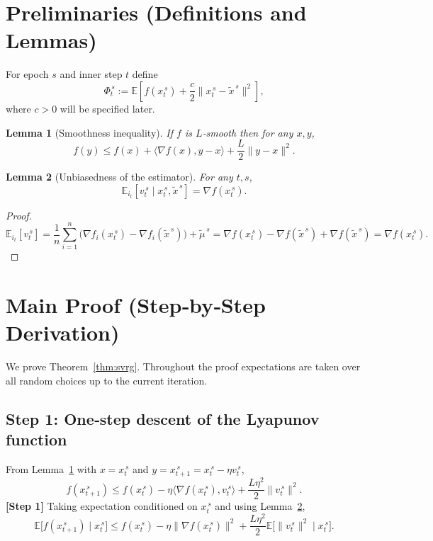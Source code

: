 \documentclass{article}
\newtheorem{lemma}{Lemma}
\newcommand{\EE}{\mathbb{E}}
\begin{document}
\section*{Preliminaries (Definitions and Lemmas)}
\begin{definition}\label{def:lyap}
For epoch $s$ and inner step $t$ define
\[
\Phi_{t}^{\,s}:= \EE\!\left[ f(x_{t}^{\,s}) + \frac{c}{2}\|x_{t}^{\,s}-\tilde{x}^{\,s}\|^{2}\right],
\tag{5}
\]
where $c>0$ will be specified later.
\end{definition}
\begin{lemma}[Smoothness inequality]\label{lem:smooth}
If $f$ is $L$‑smooth then for any $x,y$,
\[
f(y)\le f(x)+\langle\nabla f(x),y-x\rangle+\frac{L}{2}\|y-x\|^{2}.
\tag{6}
\]
\end{lemma}
\begin{lemma}[Unbiasedness of the estimator]\label{lem:unbiased}
For any $t,s$,
\[
\EE_{i_t}[v_t^{\,s}\mid x_{t}^{\,s},\tilde{x}^{\,s}]
= \nabla f(x_{t}^{\,s}).
\tag{7}
\]
\end{lemma}
\begin{proof}
\[
\EE_{i_t}[v_t^{\,s}]
=\frac{1}{n}\sum_{i=1}^{n}\bigl(\nabla f_i(x_{t}^{\,s})-\nabla f_i(\tilde{x}^{\,s})\bigr)+\tilde{\mu}^{\,s}
= \nabla f(x_{t}^{\,s})-\nabla f(\tilde{x}^{\,s})+\nabla f(\tilde{x}^{\,s})
= \nabla f(x_{t}^{\,s}).
\tag{8}
\]
\end{proof}

\section*{Main Proof (Step‑by‑Step Derivation)}
We prove Theorem~\ref{thm:svrg}.  Throughout the proof expectations are taken over all random choices up to the current iteration.

\subsection*{Step 1: One‑step descent of the Lyapunov function}
From Lemma~\ref{lem:smooth} with $x=x_{t}^{\,s}$ and $y=x_{t+1}^{\,s}=x_{t}^{\,s}-\eta v_t^{\,s}$,
\[
f(x_{t+1}^{\,s})\le f(x_{t}^{\,s})-\eta\langle\nabla f(x_{t}^{\,s}),v_t^{\,s}\rangle
+\frac{L\eta^{2}}{2}\|v_t^{\,s}\|^{2}.
\tag{9}
\]
\textbf{[Step 1]} Taking expectation conditioned on $x_{t}^{\,s}$ and using Lemma~\ref{lem:unbiased},
\[
\EE\!\bigl[f(x_{t+1}^{\,s})\mid x_{t}^{\,s}\bigr]
\le f(x_{t}^{\,s})-\eta\|\nabla f(x_{t}^{\,s})\|^{2}
+\frac{L\eta^{2}}{2}\EE\!\bigl[\|v_t^{\,s}\|^{2}\mid x_{t}^{\,s}\bigr].
\tag{10}
\]
\end{document}
